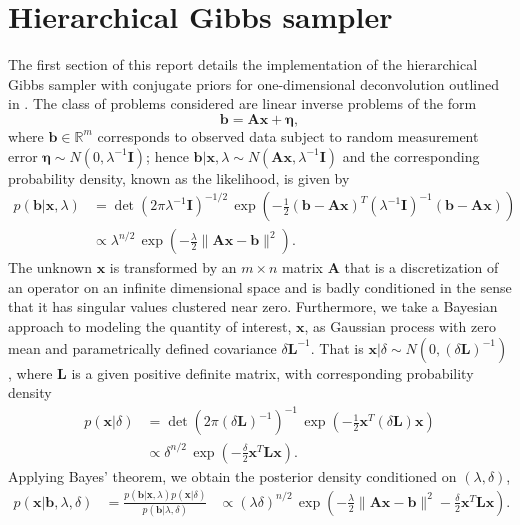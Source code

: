 \documentclass{article}
\newcommand{\RR}{{\mathbb R}}
\newcommand{\vect}[1]{\boldsymbol{#1}}
\begin{document}
\section{ Hierarchical Gibbs sampler }
The first section of this report details the implementation of the hierarchical Gibbs sampler with conjugate priors for one-dimensional deconvolution outlined in \cite{bardsley2012mcmc}.
The class of problems considered are linear inverse problems of the form
$$
  \vect b = \vect A \vect x + \vect \eta,
$$
where $\vect b\in \RR^m$ corresponds to observed data subject to random measurement error $\vect \eta \sim N(0,\lambda^{-1}\vect I)$; hence $\vect b|\vect x,\lambda \sim N(\vect{Ax},\lambda^{-1}\vect I)$ and the corresponding probability density, known as the likelihood, is given by
\begin{align*}
  p(\vect b | \vect x, \lambda) 
  &= \det(2\pi\lambda^{-1} \vect I)^{-1/2}\,\exp \left( -\frac 12 (\vect b - \vect{Ax})^T(\lambda^{-1}\vect{I})^{-1}(\vect b - \vect{Ax}) \right)\\
  &\propto \lambda^{n/2}\,\exp\left(-\frac \lambda2 \|\vect{Ax} - \vect b\|^2 \right). 
\end{align*}
The unknown $\vect x$ is transformed by an $m\times n$ matrix $\vect A$ that is a discretization of an operator on an infinite dimensional space and is badly conditioned in the sense that it has singular values clustered near zero.  
Furthermore, we take a Bayesian approach to modeling the quantity of interest, $\vect x$, as Gaussian process with zero mean and parametrically defined covariance $\delta \vect L^{-1}$. 
That is $\vect x|\delta \sim N(0,(\delta \vect L)^{-1})$, where $\vect L$ is a given positive definite matrix, with corresponding probability density 
\begin{align*}
  p(\vect x|\delta ) 
  &= \det(2\pi (\delta \vect L)^{-1})^{-1}\,\exp\left(-\frac 12 \vect x^T (\delta \vect L)\vect x\right) \\
  &\propto \delta^{n/2}\,\exp\left(-\frac \delta2 \vect x^T \vect L \vect x\right).
\end{align*}
Applying Bayes' theorem, we obtain the posterior density conditioned on $(\lambda,\delta)$,
\begin{align*}
  p(\vect x | \vect b, \lambda, \delta) 
  &= \frac{p(\vect b | \vect x,\lambda) p(\vect x | \delta)}{p(\vect b|\lambda,\delta)} %
  &\propto (\lambda\delta)^{n/2}\,\exp\left(-\frac{\lambda}{2}\|\vect{Ax} - \vect b\|^2 - \frac{\delta}{2}\vect x^T \vect L \vect x\right). 
\end{align*}
\end{document}
